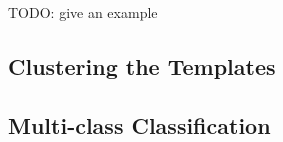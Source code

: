 TODO: give an example

\subsection{Clustering the Templates}
\label{subsec:clustering}





\subsection{Multi-class Classification}
\label{subsec:multi-class}


